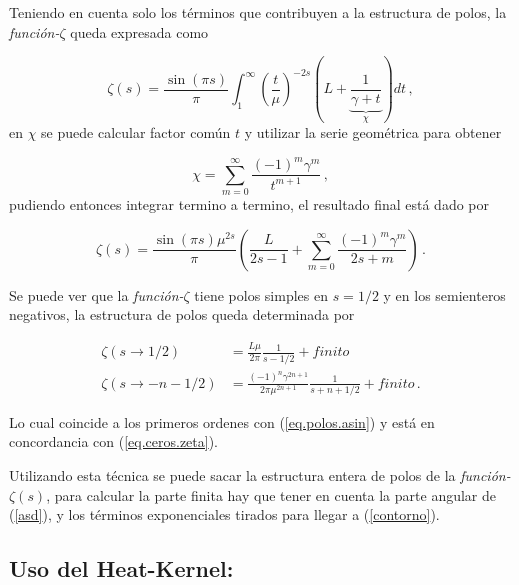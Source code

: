 Teniendo en cuenta solo los términos que contribuyen a la estructura de polos, la {\it función-$\zeta$} queda expresada como

\begin{equation}
	\zeta  (s) = 
    \frac{ \sin (\pi s)}{ \pi } 
    \int _1 ^{\infty} 
    \left( \frac{t}{\mu}  \right)^{-2s}
    \left(
    	L + 
	    \underbrace
    	{
		\frac{1}{\gamma + t}   
		} _{\chi} 
	\right)
    dt  \,  ,
\label{contorno}
\end{equation}
en $\chi$ se puede calcular factor común $t$ y utilizar la serie geométrica para obtener

\begin{equation}
    \chi =   \sum _{m=0} ^{\infty} \frac{(-1) ^{m} \gamma ^{m} }{t ^{m+1}}
    \, ,
\label{eq:chi}
\end{equation}
pudiendo entonces integrar termino a termino, el resultado final está dado por

\begin{equation}
    \zeta  (s) = 
    \frac{ \sin(\pi s) \mu ^{2s }}{\pi } 
    \left(
    \frac{L}{2s-1} + 
    \sum _{m=0} ^{\infty}
    \frac{(-1) ^{m} \gamma ^{m} }{2s+m}
    \right) \, .
\label{eq.zeta.com}
\end{equation}

Se puede ver que la {\it función-$\zeta$} tiene polos simples en $s=1/2$ y en los semienteros negativos, la estructura de polos queda determinada por

\begin{equation}
\begin{aligned}
\zeta(s \rightarrow 1/2) &= \frac{L \mu }{2 \pi} \frac{1}{s-1/2} + finito \\
\zeta (s \rightarrow -n - 1/2)  &= \frac{ (-1) ^n \gamma ^{2n+1}  }{2 \pi \mu ^{2n + 1}} \frac{1}{s + n + 1/2} + finito
\, .
\end{aligned}
\label{eq.polos.complejo}
\end{equation}


Lo cual coincide a los primeros ordenes con (\ref{eq.polos.asin}) y está en concordancia  con (\ref{eq.ceros.zeta}).

Utilizando esta técnica se puede sacar la estructura entera de polos de la {\it función-$\zeta (s)$}, para calcular la parte finita hay que tener en cuenta la parte angular de (\ref{asd}), y los términos exponenciales tirados para llegar a (\ref{contorno}).


\subsection{Uso del Heat-Kernel:}

